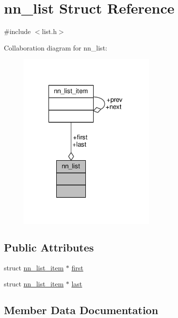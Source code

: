 \hypertarget{structnn__list}{}\section{nn\+\_\+list Struct Reference}
\label{structnn__list}


{\ttfamily \#include $<$list.\+h$>$}



Collaboration diagram for nn\+\_\+list\+:\nopagebreak
\begin{figure}[H]
\begin{center}
\leavevmode
\includegraphics[width=194pt]{structnn__list__coll__graph}
\end{center}
\end{figure}
\subsection*{Public Attributes}
\begin{DoxyCompactItemize}
\item 
struct \hyperlink{structnn__list__item}{nn\+\_\+list\+\_\+item} $\ast$ \hyperlink{structnn__list_a98de32a9535052c37fd08fa23c974e8e}{first}
\item 
struct \hyperlink{structnn__list__item}{nn\+\_\+list\+\_\+item} $\ast$ \hyperlink{structnn__list_aee15a11389419a66b183b0246a3e4683}{last}
\end{DoxyCompactItemize}


\subsection{Member Data Documentation}
